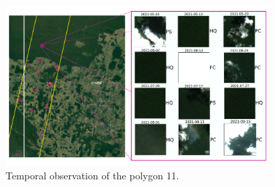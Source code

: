 \documentclass{beamer}
\begin{document}
\begin{frame}
    \begin{figure}
        \includegraphics[width=10cm]{Figures/v3/labeling/polygon_11.pdf}
        \caption{Temporal observation of the polygon 11.}  
        \centering
    \end{figure}
\end{frame}
\end{document}

